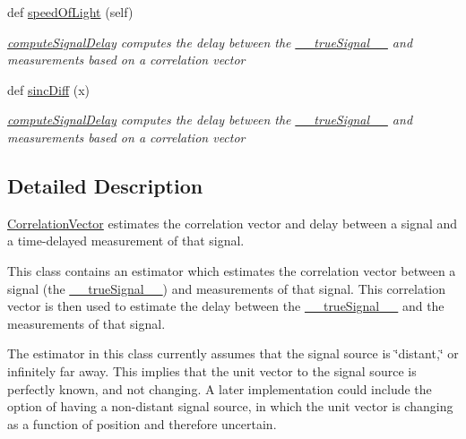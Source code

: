\begin{DoxyCompactItemize}
def \hyperlink{classmodest_1_1substates_1_1CorrelationVector_1_1CorrelationVector_ac29ed7993214a693a1db88467818bcdb}{speed\+Of\+Light} (self)
\begin{DoxyCompactList}\small\item\em \hyperlink{classmodest_1_1substates_1_1CorrelationVector_1_1CorrelationVector_ab4d8e31d05b40d4483a530db0aaeb3a4}{compute\+Signal\+Delay} computes the delay between the \hyperlink{classmodest_1_1substates_1_1CorrelationVector_1_1CorrelationVector_a40f65c10e255c043d8f56d17d152e705}{\+\_\+\+\_\+true\+Signal\+\_\+\+\_\+} and measurements based on a correlation vector \end{DoxyCompactList}\item 
def \hyperlink{classmodest_1_1substates_1_1CorrelationVector_1_1CorrelationVector_ac134326828ee036d95c5cb97e4eb6d73}{sinc\+Diff} (x)
\begin{DoxyCompactList}\small\item\em \hyperlink{classmodest_1_1substates_1_1CorrelationVector_1_1CorrelationVector_ab4d8e31d05b40d4483a530db0aaeb3a4}{compute\+Signal\+Delay} computes the delay between the \hyperlink{classmodest_1_1substates_1_1CorrelationVector_1_1CorrelationVector_a40f65c10e255c043d8f56d17d152e705}{\+\_\+\+\_\+true\+Signal\+\_\+\+\_\+} and measurements based on a correlation vector \end{DoxyCompactList}\end{DoxyCompactItemize}


\subsection{Detailed Description}
\hyperlink{classmodest_1_1substates_1_1CorrelationVector_1_1CorrelationVector}{Correlation\+Vector} estimates the correlation vector and delay between a signal and a time-\/delayed measurement of that signal. 

This class contains an estimator which estimates the correlation vector between a signal (the \hyperlink{classmodest_1_1substates_1_1CorrelationVector_1_1CorrelationVector_a40f65c10e255c043d8f56d17d152e705}{\+\_\+\+\_\+true\+Signal\+\_\+\+\_\+}) and measurements of that signal. This correlation vector is then used to estimate the delay between the \hyperlink{classmodest_1_1substates_1_1CorrelationVector_1_1CorrelationVector_a40f65c10e255c043d8f56d17d152e705}{\+\_\+\+\_\+true\+Signal\+\_\+\+\_\+} and the measurements of that signal.

The estimator in this class currently assumes that the signal source is \char`\"{}distant,\char`\"{} or infinitely far away. This implies that the unit vector to the signal source is perfectly known, and not changing. A later implementation could include the option of having a non-\/distant signal source, in which the unit vector is changing as a function of position and therefore uncertain.

